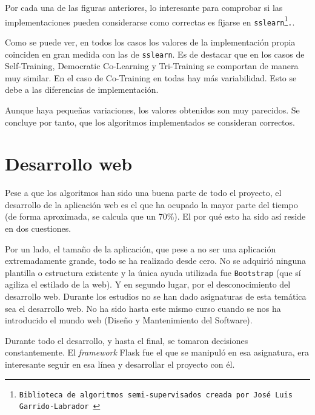 



Por cada una de las figuras anteriores, lo interesante para comprobar si las
implementaciones pueden considerarse como correctas es fijarse en
\texttt{sslearn\footnote{Biblioteca de algoritmos semi-supervisados creada por
José Luis Garrido-Labrador~\cite{jose_luis_garrido_labrador_2023_7781117}}.}.

Como se puede ver, en todos los casos los valores de la implementación propia
coinciden en gran medida con las de \texttt{sslearn}. Es de destacar que en los
casos de Self-Training, Democratic Co-Learning y Tri-Training se comportan de
manera muy similar. En el caso de Co-Training en todas hay más variabilidad.
Esto se debe a las diferencias de implementación.

Aunque haya pequeñas variaciones, los valores obtenidos son muy parecidos. Se
concluye por tanto, que los algoritmos implementados se consideran correctos.


\section{Desarrollo web}

Pese a que los algoritmos han sido una buena parte de todo el proyecto, el
desarrollo de la aplicación web es el que ha ocupado la mayor parte del tiempo
(de forma aproximada, se calcula que un 70\%). El por qué esto ha sido así
reside en dos cuestiones. 

Por un lado, el tamaño de la aplicación, que pese a no ser una aplicación
extremadamente grande, todo se ha realizado desde cero. No se adquirió ninguna
plantilla o estructura existente y la única ayuda utilizada fue
\texttt{Bootstrap} (que sí agiliza el estilado de la web). Y en segundo lugar,
por el desconocimiento del desarrollo web. Durante los estudios no se han dado
asignaturas de esta temática sea el desarrollo web. No ha sido hasta este mismo
curso cuando se nos ha introducido el mundo web (Diseño y Mantenimiento del
Software).

Durante todo el desarrollo, y hasta el final, se tomaron decisiones
constantemente. El \emph{framework} Flask fue el que se manipuló en esa
asignatura, era interesante seguir en esa línea y desarrollar el proyecto con
él. 

